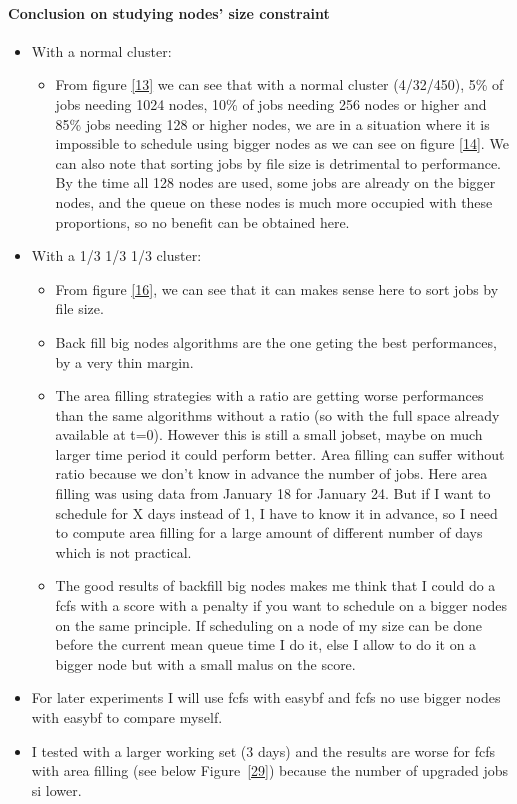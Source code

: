 \documentclass[a4paper]{article}
\begin{document}
\paragraph {Conclusion on studying nodes' size constraint}
\begin{itemize}
	\item With a normal cluster: \begin{itemize}
		\item From figure \ref{13} we can see that with a normal cluster (4/32/450), 5\% of jobs needing 1024 nodes, 10\% of jobs needing 256 nodes or higher and 85\% jobs needing 128 or higher nodes, we are in a situation where it is impossible to schedule using bigger nodes as we can see on figure \ref{14}. We can also note that sorting jobs by file size is detrimental to performance. By the time all 128 nodes are used, some jobs are already on the bigger nodes, and the queue on these nodes is much more occupied with these proportions, so no benefit can be obtained here.
	\end{itemize}
	\item With a 1/3 1/3 1/3 cluster: \begin{itemize}
		\item From figure \ref{16}, we can see that it can makes sense here to sort jobs by file size.
		\item Back fill big nodes algorithms are the one geting the best performances, by a very thin margin.
		\item The area filling strategies with a ratio are getting worse performances than the same algorithms without a ratio (so with the full space already available at t=0). However this is still a small jobset, maybe on much larger time period it could perform better. Area filling can suffer without ratio because we don't know in advance the number of jobs. Here area filling was using data from January 18 for January 24. But if I want to schedule for X days instead of 1, I have to know it in advance, so I need to compute area filling for a large amount of different number of days which is not practical.
		\item The good results of backfill big nodes makes me think that I could do a fcfs with a score with a penalty if you want to schedule on a bigger nodes on the same principle. If scheduling on a node of my size can be done before the current mean queue time I do it, else I allow to do it on a bigger node but with a small malus on the score.
	\end{itemize}
	\item For later experiments I will use fcfs with easybf and fcfs no use bigger nodes with easybf to compare myself.
	\item I tested with a larger working set (3 days) and the results are worse for fcfs with area filling (see below Figure~\ref{29}) because the number of upgraded jobs si lower.
\end{itemize}
\end{document}
